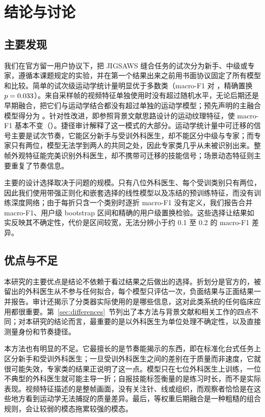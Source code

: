 \section{结论与讨论}

\subsection{主要发现}

我们在官方留一用户协议下，把 JIGSAWS 缝合任务的试次分为新手、中级或专家，遵循本课题规定的实验，并在第一个结果出来之前用书面协议固定了所有模型和比较。简单的试次级运动学统计量明显优于多数类（macro-F1 \FMOne{} 对 \FMZero{}，精确置换 $p = 0.033{}$）。来自采样帧的视频特征单独使用时没有超过随机水平，无论后期还是早期融合，把它们与运动学结合都没有超过单独的运动学模型；预先声明的主融合模型得分为 \FMThree{}。针对性改进，即参照背景文献思路设计的运动纹理特征，使 macro-F1 基本不变（\FMFour{}）。捷径审计解释了这一模式的大部分。运动学统计量中可迁移的信号主要是试次节奏，它能区分新手与受训外科医生，却不能区分中级与专家；而专家只有两位，模型无法学到两人的共同之处，因此专家类几乎从未被识别出来。整帧外观特征能完美识别外科医生，却不携带可迁移的技能信号；场景动态特征则主要重复了节奏信息。

主要的设计选择取决于问题的规模。只有八位外科医生、每个受训类别只有两位，因此我们使用带强正则化和嵌套选择的线性模型以及冻结的预训练特征，而没有训练深度网络；由于每折只含一个类别时逐折 macro-F1 没有定义，我们报告合并 macro-F1、用户级 bootstrap 区间和精确的用户级置换检验。这些选择让结果如实反映其不确定性，代价是区间较宽，无法分辨小于约 0.1 至 0.2 的 macro-F1 差异。

\subsection{优点与不足}

本研究的主要优点是结论不依赖于看过结果之后做出的选择。折划分是官方的，被留出的外科医生从不参与任何拟合，每个模型只评估一次，负面结果与正面结果一并报告。审计还揭示了分类器实际使用的是哪些信息，这对此类系统的任何临床应用都很重要。第~\ref{sec:differences}~节列出了本方法与背景文献和相关工作的四点不同；对本研究的结论而言，最重要的是以外科医生为单位处理不确定性，以及直接测量身份和节奏捷径。

本方法也有明显的不足。它最擅长的是节奏能揭示的东西，即在标准化台式任务上区分新手和受训外科医生；一旦受训外科医生之间的差别在于质量而非速度，它就很可能失效，专家类的结果正说明了这一点。模型只在七位外科医生上训练，一位不典型的外科医生就可能主导一折；自报技能标签衡量的是练习时长，而不是实际表现。视频特征描述的是整帧画面，没有关注针、线或组织，而观察者恰恰是在这些地方看到运动学无法捕捉的质量差异。最后，等权重后期融合是一种粗糙的组合规则，会让较弱的模态拖累较强的模态。

